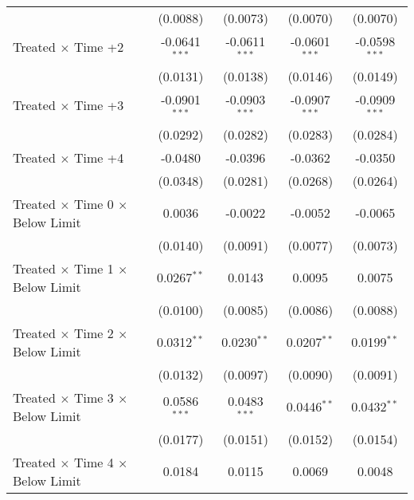 \begin{tabular*}{0.8\textwidth}{@{\extracolsep{\fill}}lcccc}
                                                    & (0.0088)        & (0.0073)        & (0.0070)        & (0.0070)\\   
    Treated $\times$ Time +2                        & -0.0641$^{***}$ & -0.0611$^{***}$ & -0.0601$^{***}$ & -0.0598$^{***}$\\   
                                                    & (0.0131)        & (0.0138)        & (0.0146)        & (0.0149)\\   
    Treated $\times$ Time +3                        & -0.0901$^{***}$ & -0.0903$^{***}$ & -0.0907$^{***}$ & -0.0909$^{***}$\\   
                                                    & (0.0292)        & (0.0282)        & (0.0283)        & (0.0284)\\   
    Treated $\times$ Time +4                        & -0.0480         & -0.0396         & -0.0362         & -0.0350\\   
                                                    & (0.0348)        & (0.0281)        & (0.0268)        & (0.0264)\\ 
   Treated $\times$ Time 0 $\times$ Below Limit     & 0.0036          & -0.0022         & -0.0052         & -0.0065\\   
                                                    & (0.0140)        & (0.0091)        & (0.0077)        & (0.0073)\\   
   Treated $\times$ Time 1 $\times$ Below Limit     & 0.0267$^{**}$   & 0.0143          & 0.0095          & 0.0075\\   
                                                    & (0.0100)        & (0.0085)        & (0.0086)        & (0.0088)\\   
   Treated $\times$ Time 2 $\times$ Below Limit     & 0.0312$^{**}$   & 0.0230$^{**}$   & 0.0207$^{**}$   & 0.0199$^{**}$\\   
                                                    & (0.0132)        & (0.0097)        & (0.0090)        & (0.0091)\\   
   Treated $\times$ Time 3 $\times$ Below Limit     & 0.0586$^{***}$  & 0.0483$^{***}$  & 0.0446$^{**}$   & 0.0432$^{**}$\\   
                                                    & (0.0177)        & (0.0151)        & (0.0152)        & (0.0154)\\   
   Treated $\times$ Time 4 $\times$ Below Limit     & 0.0184          & 0.0115          & 0.0069          & 0.0048\\   

\end{tabular*}
